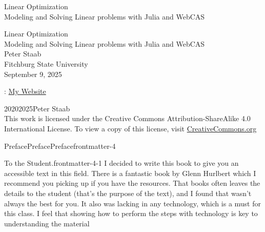 \documentclass[oneside,10pt,]{book}
\newcommand{\titlepagefont}{\relax}
\numberwithin{equation}{section}
\begin{document}
\raggedbottom
\frontmatter
\thispagestyle{empty}
{\titlepagefont\centering
\vspace*{0.28\textheight}
{\Huge Linear Optimization}\\[2\baselineskip]
{\LARGE Modeling and Solving Linear problems with Julia and WebCAS}\\
}
\clearpage
\thispagestyle{empty}
{\titlepagefont\centering
\vspace*{0.14\textheight}
{\Huge Linear Optimization}\\[\baselineskip]
{\LARGE Modeling and Solving Linear problems with Julia and WebCAS}\\[3\baselineskip]
{\Large Peter Staab}\\[0.5\baselineskip]
{\Large Fitchburg State University}\\[3\baselineskip]
{\Large September 9, 2025}\\}
\clearpage
\thispagestyle{empty}
\hypertarget{front-colophon}{}
: \href{https://pretextbook.org}{My Website}\par\medskip
\noindent\textcopyright{}2020\textendash{}2025\quad{}Peter Staab\\[0.5\baselineskip]
This work is licensed under the Creative Commons Attribution-ShareAlike 4.0 International License. To view a copy of this license, visit \href{http://creativecommons.org/licenses/by-sa/4.0/}{CreativeCommons.org}\par\medskip
{}
\null\clearpage
%
%
\typeout{************************************************}
\typeout{************************************************}
%
\begin{preface}{Preface}{Preface}{}{Preface}{}{}{frontmatter-4}
\begin{paragraphs}{To the Student.}{frontmatter-4-1}%
I decided to write this book to give you an accessible text in this field.  There is a fantastic book by Glenn Hurlbert which I recommend you picking up if you have the resources.  That books often leaves the details to the student (that's the purpose of the text), and I found that wasn't always the best for you.  It also was lacking in any technology, which is a must for this class.  I feel that showing how to perform the steps with technology is key to understanding the material%
\end{paragraphs}%
\end{preface}
\end{document}
